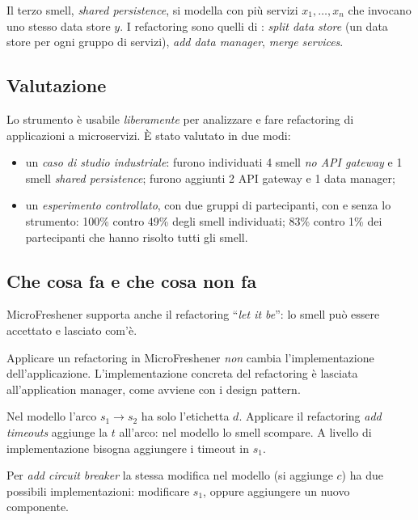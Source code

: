 Il terzo smell, \emph{shared persistence}, si modella con più servizi $x_1,\dots,x_n$ che invocano uno stesso data
store $y$. I refactoring sono quelli di : \emph{split data store} (un data store per
ogni gruppo di servizi), \emph{add data manager}, \emph{merge services}.

\subsection{Valutazione}

Lo strumento è usabile \emph{liberamente} per analizzare e fare refactoring di applicazioni a microservizi. È stato
valutato in due modi:
\begin{itemize}
  \item un \emph{caso di studio industriale}: furono individuati 4 smell \emph{no API gateway} e 1 smell \emph{shared
    persistence}; furono aggiunti 2 API gateway e 1 data manager;
  \item un \emph{esperimento controllato}, con due gruppi di partecipanti, con e senza lo strumento: 100\% contro 49\%
    degli smell individuati; 83\% contro 1\% dei partecipanti che hanno risolto tutti gli smell.
\end{itemize}

\subsection{Che cosa fa e che cosa non fa}

MicroFreshener supporta anche il refactoring ``\emph{let it be}'': lo smell può essere accettato e lasciato com'è.

\begin{idea}
Applicare un refactoring in MicroFreshener \emph{non} cambia l'implementazione dell'applicazione. L'implementazione
concreta del refactoring è lasciata all'application manager, come avviene con i design pattern.
\end{idea}

\begin{esempio}
Nel modello l'arco $s_1 \to s_2$ ha solo l'etichetta $d$. Applicare il refactoring \emph{add timeouts} aggiunge la $t$
all'arco: nel modello lo smell scompare. A livello di implementazione bisogna aggiungere i timeout in $s_1$.

Per \emph{add circuit breaker} la stessa modifica nel modello (si aggiunge $c$) ha due possibili implementazioni:
modificare $s_1$, oppure aggiungere un nuovo componente.
\end{esempio}

